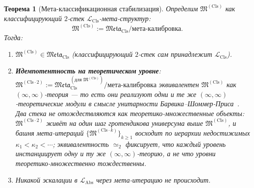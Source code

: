 \documentclass[11pt]{article}
\theoremstyle{plain}
\newtheorem{theorem}{Теорема}[section]
\theoremstyle{definition}
\newcommand{\fM}{\mathfrak{M}}
\newcommand{\Meta}{\mathfrak{Meta}}
\newcommand{\LCls}{\mathcal{L}_{\mathrm{Cls}}}
\newcommand{\LAbs}{\mathcal{L}_{\mathrm{Abs}}}
\begin{document}
\begin{theorem}[Мета-классификационная стабилизация]\label{thm:meta-stab}
Определим $\fM^{(\mathrm{Cls})}$ как классифицирующий $2$-стек $\LCls$-мета-структур:
\[ \fM^{(\mathrm{Cls})} := \Meta_{\mathrm{Cls}} / \text{мета-калибровка}. \]
Тогда:
\begin{enumerate}
\item[\textbf{(a)}] $\fM^{(\mathrm{Cls})} \in \Meta_{\mathrm{Cls}}$ (классифицирующий $2$-стек сам принадлежит $\LCls$).
\item[\textbf{(b)}] \textbf{Идемпотентность на теоретическом уровне}: $\fM^{(\mathrm{Cls}\cdot 2)} := \Meta_{\mathrm{Cls}}^{(\text{для }\fM^{(\mathrm{Cls})})} / \text{мета-калибровка}$ эквивалентен $\fM^{(\mathrm{Cls})}$ \emph{как $(\infty, \infty)$-теория} --- то есть они реализуют одни и те же $(\infty, \infty)$-теоретические модули в смысле унитарности Барвика--Шоммер-Приса~\cite{BarwickSchommerPries2021}. Два стека \emph{не} отождествляются как теоретико-множественные объекты: $\fM^{(\mathrm{Cls}\cdot 2)}$ живёт на один шаг гротендикова универсума выше $\fM^{(\mathrm{Cls})}$, и башня мета-итераций $\{\fM^{(\mathrm{Cls}\cdot k)}\}_{k \geq 1}$ восходит по иерархии недостижимых $\kappa_1 < \kappa_2 < \cdots$; эквивалентность $\simeq_2$ фиксирует, что каждый уровень инстанциирует одну и ту же $(\infty, \infty)$-теорию, а не что уровни теоретико-множественно тождественны.
\item[\textbf{(c)}] Никакой эскалации в $\LAbs$ через мета-итерацию не происходит.
\end{enumerate}
\end{theorem}
\end{document}
